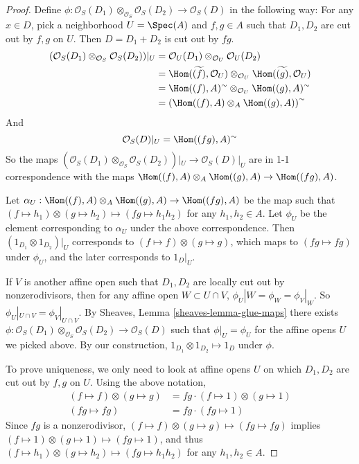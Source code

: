\begin{proof}
Define $\phi: \mathcal{O}_S(D_1) \otimes_{\mathcal{O}_S}
\mathcal{O}_S(D_2) \to \mathcal{O}_S(D) $ in the following way:
For any $x \in D$, pick a neighborhood $U = \Spec(A)$ and $f,g \in A$
such that $D_1, D_2$ are cut out by $f,g$ on $U$. Then $D = D_1 + D_2$
is cut out by $fg$.
\begin{align*}
(\mathcal{O}_S(D_1) \otimes_{\mathcal{O}_S} \mathcal{O}_S(D_2))|_U
& = \mathcal{O}_U(D_1) \otimes_{\mathcal{O}_U}
\mathcal{O}_U(D_2)  \\
&= \Hom(\widetilde{(f)}, \mathcal{O}_U)
\otimes_{\mathcal{O}_U} \Hom(\widetilde{(g)}, \mathcal{O}_U)\\
&= \Hom((f),A)^{\sim} \otimes_{\mathcal{O}_U} \Hom((g),A)^{\sim}\\
&= \left(\Hom((f),A) \otimes_A \Hom((g),A)\right)^{\sim}
\end{align*}
And
$$
\mathcal{O}_S(D)|_U = \Hom((fg),A)^{\sim}
$$
So the maps
$(\mathcal{O}_S(D_1) \otimes_{\mathcal{O}_S} \mathcal{O}_S(D_2))|_U
\to \mathcal{O}_S(D)|_U$ are in 1-1 correspondence with the maps
$\Hom((f),A) \otimes_A \Hom((g),A) \to \Hom((fg),A)$.

Let $\alpha_U :\Hom((f),A) \otimes_A \Hom((g),A) \to \Hom((fg),A)$ be
the map such that $(f \mapsto h_1) \otimes (g \mapsto h_2) \mapsto
(fg \mapsto h_1h_2)$ for any $h_1,h_2 \in A$.  Let $\phi_U$ be the element
corresponding to $\alpha_U$ under the above correspondence. Then
$(1_{D_1} \otimes 1_{D_2})|_U$ corresponds to $(f \mapsto f) \otimes
(g \mapsto g)$, which maps to $(fg \mapsto fg)$ under $\phi_U$, and
the later corresponds to $1_D|_U$.

If $V$ is another affine open such that $D_1,D_2$ are locally cut out
by nonzerodivisors, then for any affine open $W \subset U \cap V$,
$\phi_U|W = \phi_W = \phi_V|_W$.
So $\phi_U|_{U \cap V} = \phi_V|_{U \cap V}$.
By Sheaves, Lemma \ref{sheaves-lemma-glue-maps} there exists
$\phi:  \mathcal{O}_S(D_1) \otimes_{\mathcal{O}_S} \mathcal{O}_S(D_2)
\to \mathcal{O}_S(D)$ such that $\phi|_U = \phi_U$ for the affine
opens $U$ we picked above. By our construction, $1_{D_1} \otimes
1_{D_2} \mapsto 1_{D}$ under $\phi$.

To prove uniqueness, we only need to look at affine opens $U$ on which
$D_1,D_2$ are cut out by $f,g$ on $U$. Using the above notation,
\begin{align*}
(f \mapsto f) \otimes (g \mapsto g) &= fg \cdot (f \mapsto 1) \otimes (g \mapsto 1) \\
(fg \mapsto fg) &= fg \cdot (fg \mapsto 1)
\end{align*}
Since $fg$ is a nonzerodivisor,
$(f \mapsto f) \otimes (g \mapsto g) \mapsto (fg \mapsto fg)$ implies
$(f \mapsto 1) \otimes (g \mapsto 1) \mapsto (fg \mapsto 1)$, and thus
$(f \mapsto h_1) \otimes (g \mapsto h_2) \mapsto (fg \mapsto h_1h_2)$
for any $h_1,h_2 \in A$.
\end{proof}

